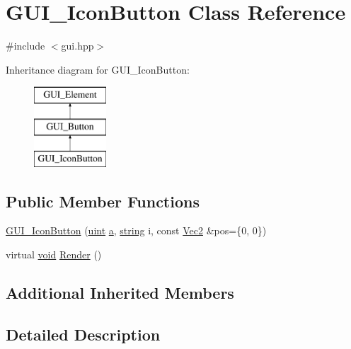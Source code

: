 \hypertarget{class_g_u_i___icon_button}{\section{G\-U\-I\-\_\-\-Icon\-Button Class Reference}
\label{class_g_u_i___icon_button}
}


{\ttfamily \#include $<$gui.\-hpp$>$}

Inheritance diagram for G\-U\-I\-\_\-\-Icon\-Button\-:\begin{figure}[H]
\begin{center}
\leavevmode
\includegraphics[height=3.000000cm]{class_g_u_i___icon_button}
\end{center}
\end{figure}
\subsection*{Public Member Functions}
\begin{DoxyCompactItemize}
\item 
\hyperlink{class_g_u_i___icon_button_ac32b0a3ace9a9fa5c1aff033e8c976e2}{G\-U\-I\-\_\-\-Icon\-Button} (\hyperlink{common_8hpp_a69aa29b598b851b0640aa225a9e5d61d}{uint} \hyperlink{_s_d_l__opengl__glext_8h_a3309789fc188587d666cda5ece79cf82}{a}, \hyperlink{_s_d_l__opengl__glext_8h_ae84541b4f3d8e1ea24ec0f466a8c568b}{string} i, const \hyperlink{class_vec2}{Vec2} \&pos=\{0, 0\})
\item 
virtual \hyperlink{_s_d_l__opengles2__gl2ext_8h_ae5d8fa23ad07c48bb609509eae494c95}{void} \hyperlink{class_g_u_i___icon_button_ad29f8f0902031536b52d21482eae04c1}{Render} ()
\end{DoxyCompactItemize}
\subsection*{Additional Inherited Members}


\subsection{Detailed Description}


